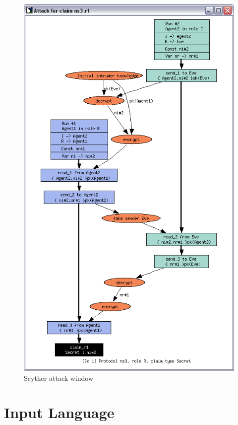 \documentclass{book}
\begin{document}
\begin{figure}[!htb]
  \begin{center}
    \includegraphics[height=0.90\textheight]{attackwindow}
  \end{center}
  \label{attackwindow}
  \caption{Scyther attack window}
\end{figure}


\chapter{Input Language}
\label{sec:input}
\end{document}
